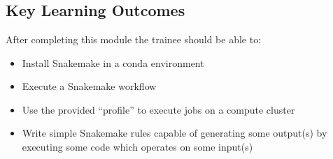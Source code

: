 
\chapter{\moduleTitle}
\newpage


% 
\section{Key Learning Outcomes}

After completing this module the trainee should be able to:
\begin{itemize}
  \item Install Snakemake in a conda environment
  \item Execute a Snakemake workflow
  \item Use the provided ``profile'' to execute jobs on a compute cluster
  \item Write simple Snakemake rules capable of generating some output(s) by executing some code which operates on some input(s)
\end{itemize}

